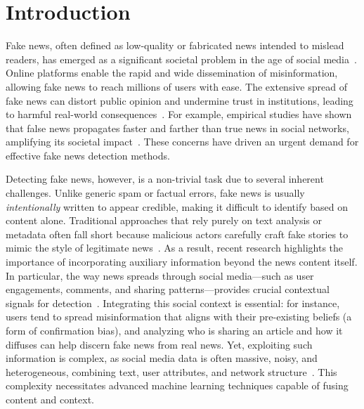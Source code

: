 \section{Introduction}

Fake news, often defined as low-quality or fabricated news intended to mislead readers, has emerged as a significant societal problem in the age of social media~\cite{Shu2017}. Online platforms enable the rapid and wide dissemination of misinformation, allowing fake news to reach millions of users with ease. The extensive spread of fake news can distort public opinion and undermine trust in institutions, leading to harmful real-world consequences~\cite{Shu2017}. For example, empirical studies have shown that false news propagates faster and farther than true news in social networks, amplifying its societal impact~\cite{Vosoughi2018}. These concerns have driven an urgent demand for effective fake news detection methods.

Detecting fake news, however, is a non-trivial task due to several inherent challenges. Unlike generic spam or factual errors, fake news is usually {\it intentionally} written to appear credible, making it difficult to identify based on content alone. Traditional approaches that rely purely on text analysis or metadata often fall short because malicious actors carefully craft fake stories to mimic the style of legitimate news~\cite{Shu2017}. As a result, recent research highlights the importance of incorporating auxiliary information beyond the news content itself. In particular, the way news spreads through social media—such as user engagements, comments, and sharing patterns—provides crucial contextual signals for detection~\cite{Shu2017}. Integrating this social context is essential: for instance, users tend to spread misinformation that aligns with their pre-existing beliefs (a form of confirmation bias), and analyzing who is sharing an article and how it diffuses can help discern fake news from real news. Yet, exploiting such information is complex, as social media data is often massive, noisy, and heterogeneous, combining text, user attributes, and network structure~\cite{Shu2017}. This complexity necessitates advanced machine learning techniques capable of fusing content and context.


